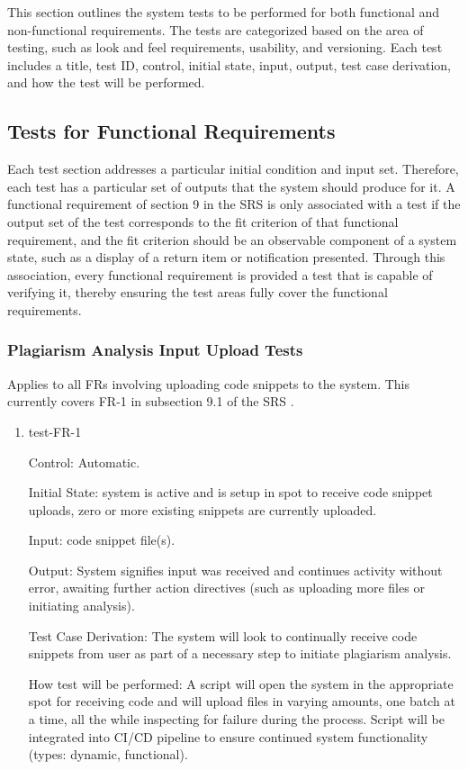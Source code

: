 \documentclass[12pt, titlepage]{article}
\begin{document}
This section outlines the system tests to be performed for both functional and non-functional requirements. 
The tests are categorized based on the area of testing, such as look and feel requirements, usability, and versioning. 
Each test includes a title, test ID, control, initial state, input, output, test case derivation, and how the test will be performed.

\subsection{Tests for Functional Requirements}

Each test section addresses a particular initial condition and input set. 
Therefore, each test has a particular set of outputs that the system should 
produce for it. A functional requirement of section 9 in the SRS \citep{SRS}
is only associated with a test if the output set of the test corresponds to 
the fit criterion of that functional requirement, and the fit criterion should 
be an observable component of a system state, such as a display of a return 
item or notification presented. Through this association, every functional 
requirement is provided a test that is capable of verifying it, thereby ensuring 
the test areas fully cover the functional requirements.

\subsubsection{Plagiarism Analysis Input Upload Tests}

Applies to all FRs involving uploading code snippets to the system. This currently 
covers FR-1 in subsection 9.1 of the SRS \citep{SRS}.

\begin{enumerate}

\item{test-FR-1\\}

Control: Automatic.
					
Initial State: system is active and is setup in spot to receive code snippet 
uploads, zero or more existing snippets are currently uploaded.
					
Input: code snippet file(s).
					
Output: System signifies input was received and continues activity without 
error, awaiting further action directives (such as uploading more files or 
initiating analysis).

Test Case Derivation: The system will look to continually receive code 
snippets from user as part of a necessary step to initiate plagiarism analysis.
					
How test will be performed: A script will open the system in the appropriate spot for 
receiving code and will upload files in varying amounts, one batch at a time, all the 
while inspecting for failure during the process. Script will be integrated into CI/CD
pipeline to ensure continued system functionality (types: dynamic, functional).
					

\end{enumerate}
\end{document}
